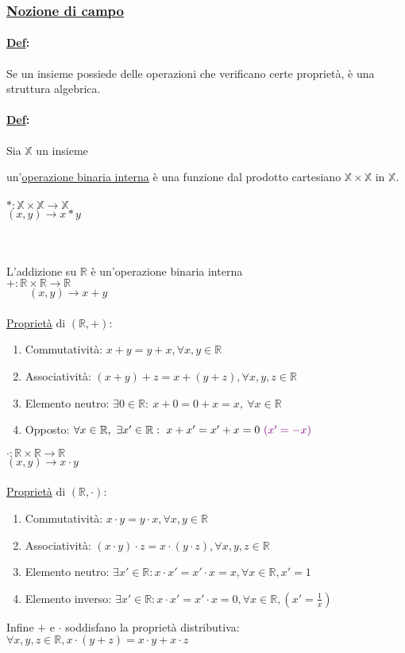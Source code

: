 \documentclass{article}
\newcommand{\ul}[1]{\underline{#1}}
\newcommand{\R}{\mathbb{R}}
\newcommand{\X}{\mathbb{X}}
\newcommand{\Def}[2]{\paragraph{\ul{Def}:}#1\\\hspace*{3em}\begin{minipage}{.8\textwidth}#2\end{minipage}}
\begin{document}
\subsubsection{\color{blue}\ul{Nozione di campo}}
\Def{Se un insieme possiede delle operazioni che verificano certe proprietà, è una struttura algebrica.}{}
\Def{Sia $\X$ un insieme}{un'\ul{operazione binaria interna} è una funzione dal prodotto cartesiano $\X\times \X$ in $\X$.\\\\$*:\X\times\X\rightarrow\X$\\\hspace*{1.4em}$(x,y)\rightarrow x*y$}\\\vspace{1em}\\
L'addizione su $\R$ è un'operazione binaria interna\\$+:\R\times\R\rightarrow\R$\\\hspace*{-0.7em}$\qquad(x,y)\rightarrow x+y$\\\\
\ul{Proprietà} di $(\R,+)$:
\begin{enumerate}
	\item Commutatività: $x+y=y+x,\forall x,y\in\R$
	\item Associatività: $(x+y)+z=x+(y+z),\forall x,y,z\in\R$
	\item Elemento neutro: $\exists0\in\R:\ x+0=0+x=x,\ \forall x\in\R$
	\item Opposto: $\forall x\in\R,\ \exists x'\in\R:\ x+x'=x'+x=0\ \color{violet}(x'=-x)$
\end{enumerate}
$\cdot:\R\times\R\rightarrow\R$\\
\hspace*{1.5em}$(x,y)\rightarrow x\cdot y$\\\\
\ul{Proprietà} di $(\R,\cdot)$:
\begin{enumerate}
	\item Commutatività: $x\cdot y=y\cdot x,\forall x,y\in\R$
	\item Associatività: $(x\cdot y)\cdot z=x\cdot(y\cdot z),\forall x,y,z\in\R$
	\item Elemento neutro: $\exists x'\in\R:x\cdot x'=x'\cdot x=x,\forall x\in\R,x'=1$
	\item Elemento inverso: $\exists x'\in\R:x\cdot x'=x'\cdot x=0,\forall x\in\R,(x'=\frac{1}{x})$
\end{enumerate}
Infine $+$ e $\cdot$ soddisfano la proprietà distributiva: $\forall x,y,z\in\R,x\cdot(y+z)=x\cdot y+x\cdot z$
\end{document}
